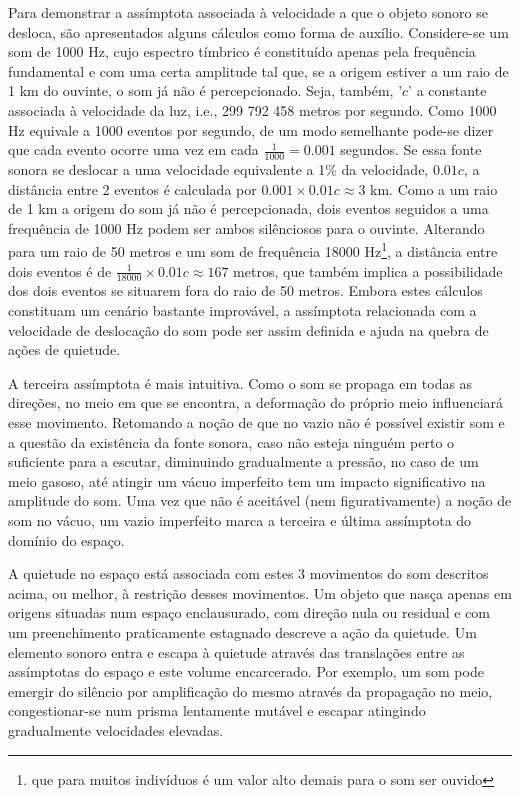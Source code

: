 \documentclass[../main.tex]{subfiles}
\begin{document}
Para demonstrar a assímptota associada à velocidade a que o objeto sonoro se desloca, são apresentados alguns cálculos como forma de auxílio. Considere-se um som de 1000 Hz, cujo espectro tímbrico é constituído apenas pela frequência fundamental e com uma certa amplitude tal que, se a origem estiver a um raio de 1 km do ouvinte, o som já não é percepcionado. Seja, também, '$c$' a constante associada à velocidade da luz, i.e., 299 792 458 metros por segundo\cite{penrose2004road}. Como 1000 Hz equivale a 1000 eventos por segundo, de um modo semelhante pode-se dizer que cada evento ocorre uma vez em cada $\frac{1}{1000} = 0.001$ segundos. Se essa fonte sonora se deslocar a uma velocidade equivalente a 1\% da velocidade, $0.01c$, a distância entre 2 eventos é calculada por $0.001 \times 0.01c \approx 3$ km. Como a um raio de 1 km a origem do som já não é percepcionada, dois eventos seguidos a uma frequência de 1000 Hz podem ser ambos silênciosos para o ouvinte. Alterando para um raio de 50 metros e um som de frequência 18000 Hz\footnote{que para muitos indivíduos é um valor alto demais para o som ser ouvido\cite{olson}}, a distância entre dois eventos é de $\frac{1}{18000}\times 0.01c \approx 167$ metros, que também implica a possibilidade dos dois eventos se situarem fora do raio de 50 metros. Embora estes cálculos constituam um cenário bastante improvável, a assímptota relacionada com a velocidade de deslocação do som pode ser assim definida e ajuda na quebra de ações de quietude.

A terceira assímptota é mais intuitiva. Como o som se propaga em todas as direções, no meio em que se encontra, a deformação do próprio meio influenciará esse movimento. Retomando a noção de que no vazio não é possível existir som e a questão da existência da fonte sonora, caso não esteja ninguém perto o suficiente para a escutar, diminuindo gradualmente a pressão, no caso de um meio gasoso, até atingir um vácuo imperfeito tem um impacto significativo na amplitude do som\cite{kinsler2000fundamentals}. Uma vez que não é aceitável (nem figurativamente) a noção de som no vácuo, um vazio imperfeito marca a terceira e última assímptota do domínio do espaço.

A quietude no espaço está associada com estes 3 movimentos do som descritos acima, ou melhor, à restrição desses movimentos. Um objeto que nasça apenas em origens situadas num espaço enclausurado, com direção nula ou residual e com um preenchimento praticamente estagnado descreve a ação da quietude. Um elemento sonoro entra e escapa à quietude através das translações entre as assímptotas do espaço e este volume encarcerado. Por exemplo, um som pode emergir do silêncio por amplificação do mesmo através da propagação no meio, congestionar-se num prisma lentamente mutável e escapar atingindo gradualmente velocidades elevadas.
\end{document}
